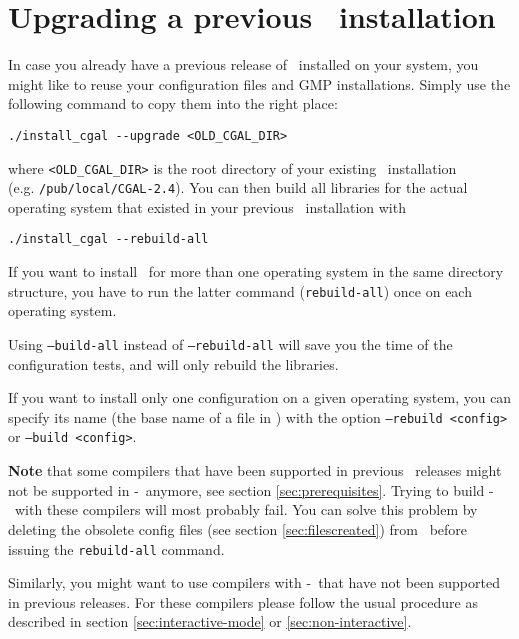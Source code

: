 \section{Upgrading a previous \cgal\ installation}
\label{sec:upgrade}

In case you already have a previous release of \cgal\ installed on
your system, you might like to reuse your configuration files and GMP
installations. Simply use the following command to copy them into the
right place:
\begin{verbatim}
./install_cgal --upgrade <OLD_CGAL_DIR>
\end{verbatim}
where \texttt{<OLD\_CGAL\_DIR>} is the root directory of your existing
\cgal\ installation\\ (e.g. \texttt{/pub/local/CGAL-2.4}).  You can
then build all libraries for the actual operating system that existed
in your previous \cgal\ installation with
\begin{verbatim}
./install_cgal --rebuild-all
\end{verbatim}

If you want to install \cgal\ for more than one operating system in
the same directory structure, you have to run the latter command
(\texttt{rebuild-all}) once on each operating system.

Using \texttt{--build-all} instead of \texttt{--rebuild-all} will save
you the time of the configuration tests, and will only rebuild the libraries.

If you want to install only one configuration on a given operating system,
you can specify its name (the base name of a file in \cgalinstconfdir) with
the option \texttt{--rebuild <config>} or \texttt{--build <config>}.

\textbf{Note} that some compilers that have been supported in previous
\cgal\ releases might not be supported in \cgal-\cgalrelease\ anymore,
see section \ref{sec:prerequisites}. Trying to build
\cgal-\cgalrelease\ with these compilers will most probably fail. You
can solve this problem by deleting the obsolete config files (see
section \ref{sec:filescreated}) from \cgalinstconfdir\ before issuing
the \texttt{rebuild-all} command.

Similarly, you might want to use compilers with \cgal-\cgalrelease\ 
that have not been supported in previous releases. For these compilers
please follow the usual procedure as described in section
\ref{sec:interactive-mode} or \ref{sec:non-interactive}.

